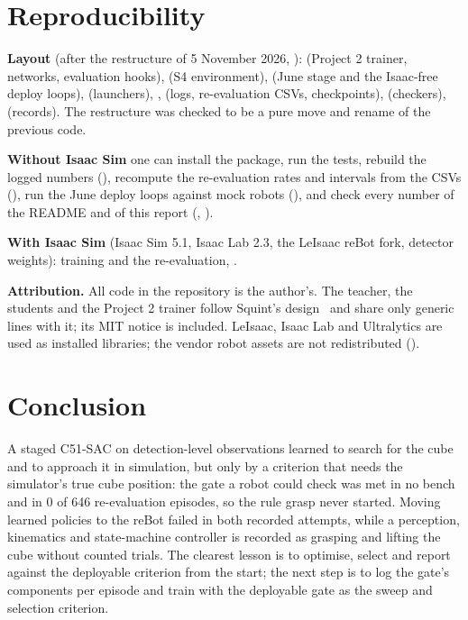 \documentclass[conference,10pt]{IEEEtran}
\begin{document}
\section{Reproducibility}\label{sec:repro}
\textbf{Layout} (after the restructure of 5 November 2026, ):
 (Project 2 trainer, networks, evaluation hooks),  (S4
environment),  (June stage and the Isaac-free deploy loops),
 (launchers), ,  (logs, re-evaluation CSVs, checkpoints),
 (checkers),  (records). The restructure was checked to be a pure move and rename of
the previous code.

\textbf{Without Isaac Sim} one can install the package, run the tests, rebuild the logged numbers
(), recompute the re-evaluation rates and intervals from the CSVs
(), run the June deploy loops against
mock robots (), and check every number of the README and of this report
(, ).

\textbf{With Isaac Sim} (Isaac Sim 5.1, Isaac Lab 2.3, the LeIsaac reBot fork, detector weights): training and the
re-evaluation, .

\textbf{Attribution.} All code in the repository is the author's. The teacher, the students and the Project 2 trainer
follow Squint's design~\cite{squint} and share only generic lines with it; its MIT notice is included. LeIsaac, Isaac
Lab and Ultralytics are used as installed libraries; the vendor robot assets are not redistributed
().

\section{Conclusion}\label{sec:conclusion}
A staged C51-SAC on detection-level observations learned to search for the cube and to approach it in simulation, but
only by a criterion that needs the simulator's true cube position: the gate a robot could check was met in no bench and
in 0 of 646 re-evaluation episodes, so the rule grasp never started. Moving learned policies to the reBot failed in both
recorded attempts, while a perception, kinematics and state-machine controller is recorded as grasping and lifting the
cube without counted trials. The clearest lesson is to optimise, select and report against the deployable criterion
from the start; the next step is to log the gate's components per episode and train with the deployable gate as the
sweep and selection criterion.
\end{document}
